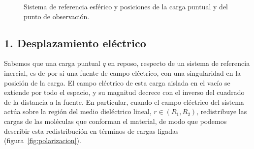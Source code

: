 \documentclass[11pt]{article}
\begin{document}
\begin{figure}[H]
{%
}

\caption{Sistema de referencia esférico y posiciones de la carga puntual
y del punto de observación.}
\label{fig:coordenadas}
\end{figure}

\subsection*{1. Desplazamiento eléctrico}
Sabemos que una carga puntual $q$ en reposo, respecto de un sistema
de referencia inercial, es de por sí una fuente de campo eléctrico,
con una singularidad en la posición de la carga. El campo eléctrico
de esta carga aislada en el vacío se extiende por todo el espacio,
y su magnitud decrece con el inverso del cuadrado de la distancia
a la fuente. En particular, cuando el campo eléctrico del sistema
actúa sobre la región del medio dieléctrico lineal,
$r\in(R_1,R_2)$, redistribuye las cargas de las moléculas que
conforman el material, de modo que podemos describir esta
redistribución en términos de cargas ligadas
(figura~\ref{fig:polarizacion}).
\end{document}
